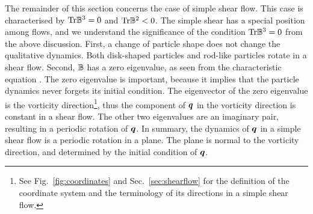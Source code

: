 \documentclass[thesis.tex]{subfiles}
\begin{document}
The remainder of this section concerns the case of simple shear flow. This case is characterised by $\mbox{Tr} \mathbb{B}^3=0$ and $\mbox{Tr} \mathbb{B}^2<0$. The simple shear has a special position among flows, and we understand the significance of the condition $\mbox{Tr}\mathbb{B}^3=0$ from the above discussion. First, a change of particle shape does not change the qualitative dynamics. Both disk-shaped particles and rod-like particles rotate in a shear flow. Second, $\mathbb{B}$ has a zero eigenvalue, as seen from the characteristic equation . The zero eigenvalue is important, because it implies that the particle dynamics never forgets its initial condition. The eigenvector of the zero eigenvalue is the vorticity direction\footnote{See Fig.~\ref{fig:coordinates} and Sec.~\ref{sec:shearflow} for the definition of the coordinate system and the terminology of its directions in a simple shear flow.}, thus the component of $\mbox{\boldmath$q$}$ in the vorticity direction is constant in a shear flow. The other two eigenvalues are an imaginary pair, resulting in a periodic rotation of $\mbox{\boldmath$q$}$. In summary, the dynamics of $\mbox{\boldmath$q$}$ in a simple shear flow is a periodic rotation in a plane. The plane is normal to the vorticity direction, and determined by the initial condition of $\mbox{\boldmath$q$}$.
\end{document}
